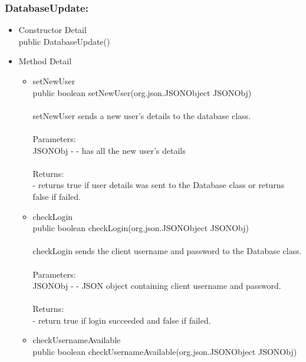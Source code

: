 \documentclass[letterpaper]{article}
\begin{document}
						\vspace{0.2in}
						\subsubsection*{DatabaseUpdate:}
						\vspace{0.1in}	
							\begin{itemize}
								\item	Constructor Detail \\
										public DatabaseUpdate()
								\item	Method Detail
										\begin{itemize}
											\item	setNewUser \\
													public boolean setNewUser(org.json.JSONObject JSONObj) \\ \\
													setNewUser sends a new user's details to the database class. \\ \\
													Parameters: \\
													JSONObj - - has all the new user's details \\ \\
													Returns: \\
													- returns true if user details was sent to the Database class or returns false if failed.
											\item	checkLogin \\
													public boolean checkLogin(org.json.JSONObject JSONObj) \\ \\
													checkLogin sends the client username and password to the Database class. \\ \\
													Parameters: \\
													JSONObj - - JSON object containing client username and password. \\ \\
													Returns: \\
													- return true if login succeeded and false if failed.
											\item	checkUsernameAvailable \\
													public boolean checkUsernameAvailable(org.json.JSONObject JSONObj) \\ \\

\end{itemize}
\end{itemize}
\end{document}
